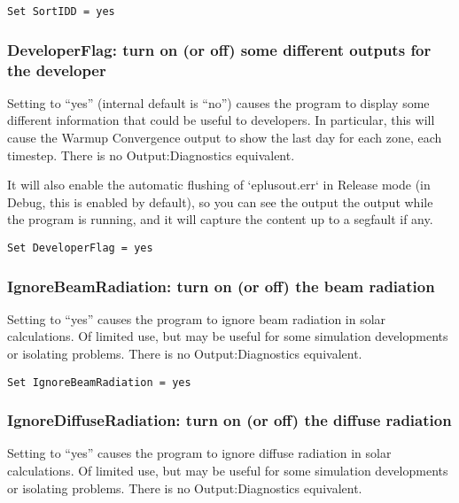 \begin{lstlisting}
Set SortIDD = yes
\end{lstlisting}

\subsubsection{DeveloperFlag: turn on (or off) some different outputs for the developer}\label{developerflag-turn-on-or-off-some-different-outputs-for-the-developer}

Setting to ``yes'' (internal default is ``no'') causes the program to display some different information that could be useful to developers. In particular, this will cause the Warmup Convergence output to show the last day for each zone, each timestep. There is no Output:Diagnostics equivalent.

It will also enable the automatic flushing of `eplusout.err` in Release mode (in Debug, this is enabled by default), so you can see the output the output while the program is running, and it will capture the content up to a segfault if any.

\begin{lstlisting}
Set DeveloperFlag = yes
\end{lstlisting}

\subsubsection{IgnoreBeamRadiation: turn on (or off) the beam radiation}\label{ignorebeamradiation-turn-on-or-off-the-beam-radiation}

Setting to ``yes'' causes the program to ignore beam radiation in solar calculations. Of limited use, but may be useful for some simulation developments or isolating problems. There is no Output:Diagnostics equivalent.

\begin{lstlisting}
Set IgnoreBeamRadiation = yes
\end{lstlisting}

\subsubsection{IgnoreDiffuseRadiation: turn on (or off) the diffuse radiation}\label{ignorediffuseradiation-turn-on-or-off-the-diffuse-radiation}

Setting to ``yes'' causes the program to ignore diffuse radiation in solar calculations. Of limited use, but may be useful for some simulation developments or isolating problems. There is no Output:Diagnostics equivalent.


